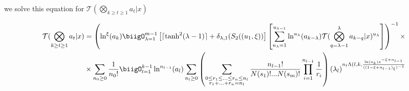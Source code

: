 we solve this equation for \( \mathcal{T}(\bigotimes_{k 
\geq t \geq 1}a_t| x)\)

\begin{align}
        \mathcal{T}(\bigotimes_{k \geq t \geq 1}a_t| x)
        &=\left(\ln^\xi (a_k) \biigO_{\lambda = 1}^{m-1} 
        \left[ \lceil \tanh^2(\lambda -1)\rceil+\delta_{\lambda,
        1}(S_2((u_1, \xi))\right]\left[\sum_{u_{\lambda}=1}^{
        u_{\lambda-1}}\ln^{u_{\lambda}}(a_{k-\lambda}) \mathcal{
        T}(\bigotimes_{q = \lambda-1}^\lambda a_{k-q} |x)^{u_{
        \lambda}} \right]\right)^{-1}\times \\ &\times \sum_{
        n_0\geq 0}\frac{1}{n_0!}\biigO_{l=1}^{k-1}
        \ln^{n_{l-1}}(a_l)
        \sum_{n_l\geq0} \left(\sum_{\substack{0\leq r_1 \leq..
        .\leq r_n\leq n_l \\ r_1 +...+r_n = n_l}}\frac{n_{l-1}!
        }{N(s_1)!...N(s_m)!}\prod_{i=1}^{n_{l-1}} \frac{1}{r_i}
        \right)(\lambda_l)^{n_l \Lambda(l, k,\frac{\ln(a_k)x^{
        -\xi+n_{l-1}}}{((1-\xi + n_{l-1})_\xi)^{-1}}}
\end{align}

